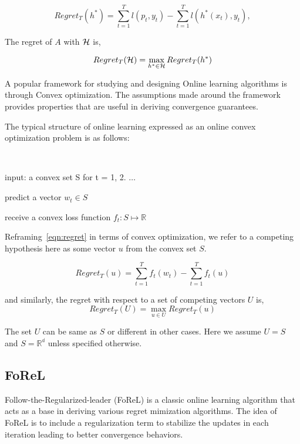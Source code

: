 \begin{equation}
	\label{eqn:regret}
	Regret_T(h^*) = \sum_{t=1}^T l(p_t, y_t) - \sum_{t=1}^T l(h^*(x_t), y_t),
\end{equation}

The regret of $A$ with $\mathcal{H}$ is,

\begin{equation}
	\label{eqn:regret_all} Regret_T(\mathcal{H}) = \max_{h^* \in \mathcal{H}} Regret_T(h^*)
\end{equation}

A popular framework for studying and designing Online learning algorithms is
through Convex optimization.
The assumptions made around the framework provides properties that are useful in deriving
convergence guarantees.

The typical structure of online learning expressed as an online convex optimization problem is as
follows:

\begin{alprocedure}[H] ~\label{alg:oco}

	input: a convex set S for t = 1, 2.
	$\ldots$

	predict a vector $w_t \in S$

	receive a convex loss function $f_t: S \mapsto \mathbb{R}$
\end{alprocedure}

Reframing~\ref{eqn:regret} in terms of convex optimization, we refer to a competing hypothesis here
as some vector $u$ from the convex set $S$.

\begin{equation}
	Regret_T(u) = \sum_{t=1}^T f_t(w_t) - \sum_{t=1}^T f_t(u)
\end{equation}

and
similarly, the regret with respect to a set of competing vectors $U$ is, \begin{equation}
	Regret_T(U) = \max_{u \in U} Regret_T(u)
\end{equation}

The set $U$ can be same
as $S$ or different in other cases.
Here we assume $U=S$ and $S=\mathbb{R^d}$ unless specified otherwise.

\subsection{FoReL}\label{sec:forel}

Follow-the-Regularized-leader (FoReL) is a classic online learning algorithm that acts as a base in
deriving various regret mimization algorithms.
The idea of FoReL is to include a regularization term to stabilize the updates in each iteration
leading to better convergence behaviors.

